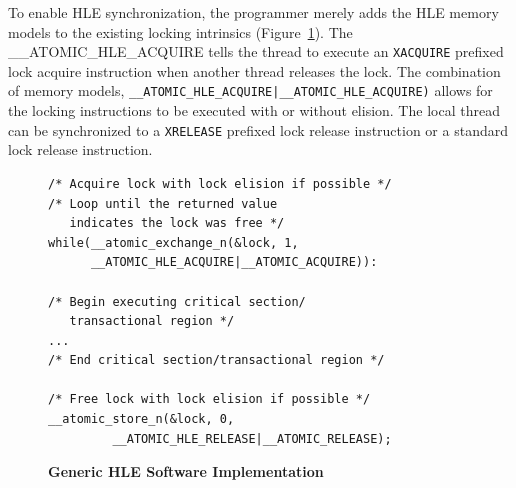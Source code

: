 \documentclass{sig-alternate}
\begin{document}

To enable HLE synchronization, the programmer merely adds the HLE memory models to the
existing locking intrinsics (Figure~\ref{fig:hle_interface}).  The
\_\_ATOMIC\_HLE\_ACQUIRE tells the thread to execute an \texttt{XACQUIRE} prefixed lock
acquire instruction when another thread releases the lock.  The combination of memory
models, \texttt{\_\_ATOMIC\_HLE\_ACQUIRE|\_\_ATOMIC\_HLE\_ACQUIRE)} allows for the locking
instructions to be executed with or without elision.  The local thread can be synchronized
to a \texttt{XRELEASE} prefixed lock release instruction or a standard lock release
instruction.

\begin{figure}
\begin{verbatim}
/* Acquire lock with lock elision if possible */
/* Loop until the returned value 
   indicates the lock was free */
while(__atomic_exchange_n(&lock, 1, 
      __ATOMIC_HLE_ACQUIRE|__ATOMIC_ACQUIRE)):

/* Begin executing critical section/
   transactional region */
...
/* End critical section/transactional region */

/* Free lock with lock elision if possible */
__atomic_store_n(&lock, 0, 
         __ATOMIC_HLE_RELEASE|__ATOMIC_RELEASE);
\end{verbatim}
    \caption{\textbf{Generic HLE Software Implementation}}\label{fig:hle_interface}
\end{figure}
\end{document}
